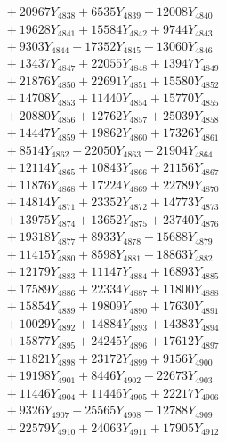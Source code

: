 \documentclass[a4paper,10pt]{article}
\begin{document}
{\begin{align}
&\;  + 20967 Y_{4838} + 6535 Y_{4839} + 12008 Y_{4840} \\[0.3ex]
&\;  + 19628 Y_{4841} + 15584 Y_{4842} + 9744 Y_{4843} \\[0.3ex]
&\;  + 9303 Y_{4844} + 17352 Y_{4845} + 13060 Y_{4846} \\[0.3ex]
&\;  + 13437 Y_{4847} + 22055 Y_{4848} + 13947 Y_{4849} \\[0.3ex]
&\;  + 21876 Y_{4850} + 22691 Y_{4851} + 15580 Y_{4852} \\[0.3ex]
&\;  + 14708 Y_{4853} + 11440 Y_{4854} + 15770 Y_{4855} \\[0.3ex]
&\;  + 20880 Y_{4856} + 12762 Y_{4857} + 25039 Y_{4858} \\[0.5ex]\allowbreak
&\;  + 14447 Y_{4859} + 19862 Y_{4860} + 17326 Y_{4861} \\[0.3ex]
&\;  + 8514 Y_{4862} + 22050 Y_{4863} + 21904 Y_{4864} \\[0.3ex]
&\;  + 12114 Y_{4865} + 10843 Y_{4866} + 21156 Y_{4867} \\[0.3ex]
&\;  + 11876 Y_{4868} + 17224 Y_{4869} + 22789 Y_{4870} \\[0.3ex]
&\;  + 14814 Y_{4871} + 23352 Y_{4872} + 14773 Y_{4873} \\[0.3ex]
&\;  + 13975 Y_{4874} + 13652 Y_{4875} + 23740 Y_{4876} \\[0.3ex]
&\;  + 19318 Y_{4877} + 8933 Y_{4878} + 15688 Y_{4879} \\[0.3ex]
&\;  + 11415 Y_{4880} + 8598 Y_{4881} + 18863 Y_{4882} \\[0.3ex]
&\;  + 12179 Y_{4883} + 11147 Y_{4884} + 16893 Y_{4885} \\[0.3ex]
&\;  + 17589 Y_{4886} + 22334 Y_{4887} + 11800 Y_{4888} \\[0.5ex]\allowbreak
&\;  + 15854 Y_{4889} + 19809 Y_{4890} + 17630 Y_{4891} \\[0.3ex]
&\;  + 10029 Y_{4892} + 14884 Y_{4893} + 14383 Y_{4894} \\[0.3ex]
&\;  + 15877 Y_{4895} + 24245 Y_{4896} + 17612 Y_{4897} \\[0.3ex]
&\;  + 11821 Y_{4898} + 23172 Y_{4899} + 9156 Y_{4900} \\[0.3ex]
&\;  + 19198 Y_{4901} + 8446 Y_{4902} + 22673 Y_{4903} \\[0.3ex]
&\;  + 11446 Y_{4904} + 11446 Y_{4905} + 22217 Y_{4906} \\[0.3ex]
&\;  + 9326 Y_{4907} + 25565 Y_{4908} + 12788 Y_{4909} \\[0.3ex]
&\;  + 22579 Y_{4910} + 24063 Y_{4911} + 17905 Y_{4912} \\[0.3ex]

\end{align}}
\end{document}
